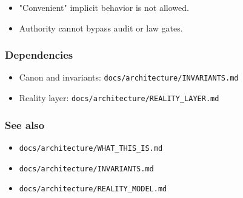 \documentclass[9pt,a4paper,openany]{book}
\begin{document}
\begin{itemize}
\item "Convenient" implicit behavior is not allowed.\allowbreak{}
\end{itemize}


\begin{itemize}
\item Authority cannot bypass audit or law gates.\allowbreak{}
\end{itemize}





\subsubsection{Dependencies}


\begin{itemize}
\item Canon and invariants: \texttt{docs/\allowbreak{}architecture/\allowbreak{}INVARIANTS.\allowbreak{}md}
\end{itemize}


\begin{itemize}
\item Reality layer: \texttt{docs/\allowbreak{}architecture/\allowbreak{}REALITY\_\allowbreak{}LAYER.\allowbreak{}md}
\end{itemize}





\subsubsection{See also}


\begin{itemize}
\item \texttt{docs/\allowbreak{}architecture/\allowbreak{}WHAT\_\allowbreak{}THIS\_\allowbreak{}IS.\allowbreak{}md}
\end{itemize}


\begin{itemize}
\item \texttt{docs/\allowbreak{}architecture/\allowbreak{}INVARIANTS.\allowbreak{}md}
\end{itemize}


\begin{itemize}
\item \texttt{docs/\allowbreak{}architecture/\allowbreak{}REALITY\_\allowbreak{}MODEL.\allowbreak{}md}
\end{itemize}
\end{document}
